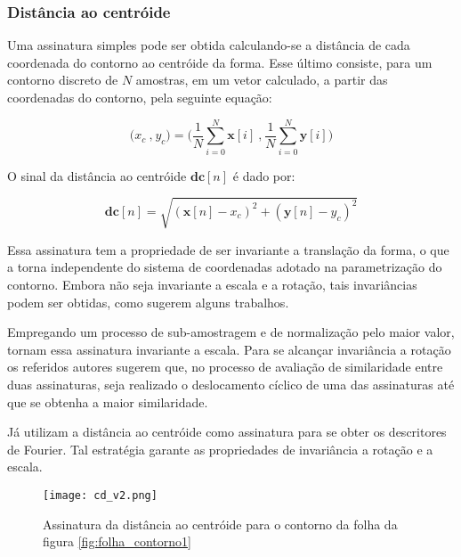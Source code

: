 \begin{comment}
Particularmente, métodos de extração de características multiescala do contorno a partir da curvatura conseguem superar o problema supracitado aplicando filtragens passa-baixa a representação paramétrica do contorno antes de se calcular a curvatura. 
\end{comment}

\subsubsection{Distância ao centróide}
Uma assinatura simples pode ser obtida calculando-se a distância de cada coordenada do contorno ao centróide da forma. Esse último consiste, para um contorno discreto de $N$ amostras, em um vetor calculado, a partir das coordenadas do contorno, pela seguinte equação: 

\begin{equation}
\big(x_{c}\:\text{,}\:y_{c}\big) = \Big(\frac{1}{N}\sum^{N}_{i=0}{\mathbf{x}[i]}\:\text{,}\:\frac{1}{N}\sum^{N}_{i=0}{\mathbf{y}[i]}\Big)
\end{equation}

O sinal da distância ao centróide $\mathbf{dc}[n]$ é dado por:

\begin{equation}
\mathbf{dc}[n] = \sqrt{(\mathbf{x}[n] - x_c)^2 + (\mathbf{y}[n] - y_c)^2}
\end{equation}

Essa assinatura tem a propriedade de ser invariante a translação da forma, o que a torna independente do sistema de coordenadas adotado na parametrização do contorno. Embora não seja invariante a escala e a rotação, tais invariâncias podem ser obtidas, como sugerem alguns trabalhos. 

Empregando um processo de sub-amostragem e de normalização pelo maior valor,  tornam essa assinatura invariante a escala. Para se alcançar invariância a rotação os referidos autores sugerem que, no processo de avaliação de similaridade entre duas assinaturas, seja realizado o deslocamento cíclico de uma das assinaturas até que se obtenha a maior similaridade.

Já  utilizam a distância ao centróide como assinatura para se obter os descritores de Fourier. Tal estratégia garante as propriedades de invariância a rotação e a escala.

\begin{figure}[h!]
  \caption{\label{fig:cd} Assinatura da distância ao centróide para o contorno da folha da figura \ref{fig:folha_contorno1}}
  \centering
  \texttt{[image: cd\_v2.png]}
\end{figure}

